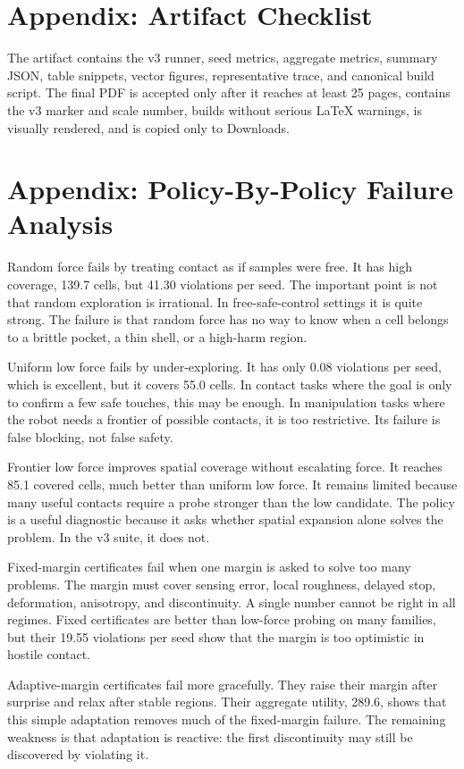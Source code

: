 \documentclass{article}
\begin{document}
\section{Appendix: Artifact Checklist}

The artifact contains the v3 runner, seed metrics, aggregate metrics, summary
JSON, table snippets, vector figures, representative trace, and canonical build
script. The final PDF is accepted only after it reaches at least 25 pages,
contains the v3 marker and scale number, builds without serious LaTeX warnings,
is visually rendered, and is copied only to Downloads.

\section{Appendix: Policy-By-Policy Failure Analysis}

Random force fails by treating contact as if samples were free. It has high
coverage, 139.7 cells, but 41.30 violations per seed. The important point is
not that random exploration is irrational. In free-safe-control settings it is
quite strong. The failure is that random force has no way to know when a cell
belongs to a brittle pocket, a thin shell, or a high-harm region.

Uniform low force fails by under-exploring. It has only 0.08 violations per
seed, which is excellent, but it covers 55.0 cells. In contact tasks where the
goal is only to confirm a few safe touches, this may be enough. In manipulation
tasks where the robot needs a frontier of possible contacts, it is too
restrictive. Its failure is false blocking, not false safety.

Frontier low force improves spatial coverage without escalating force. It
reaches 85.1 covered cells, much better than uniform low force. It remains
limited because many useful contacts require a probe stronger than the low
candidate. The policy is a useful diagnostic because it asks whether spatial
expansion alone solves the problem. In the v3 suite, it does not.

Fixed-margin certificates fail when one margin is asked to solve too many
problems. The margin must cover sensing error, local roughness, delayed stop,
deformation, anisotropy, and discontinuity. A single number cannot be right in
all regimes. Fixed certificates are better than low-force probing on many
families, but their 19.55 violations per seed show that the margin is too
optimistic in hostile contact.

Adaptive-margin certificates fail more gracefully. They raise their margin
after surprise and relax after stable regions. Their aggregate utility, 289.6,
shows that this simple adaptation removes much of the fixed-margin failure. The
remaining weakness is that adaptation is reactive: the first discontinuity may
still be discovered by violating it.
\end{document}
